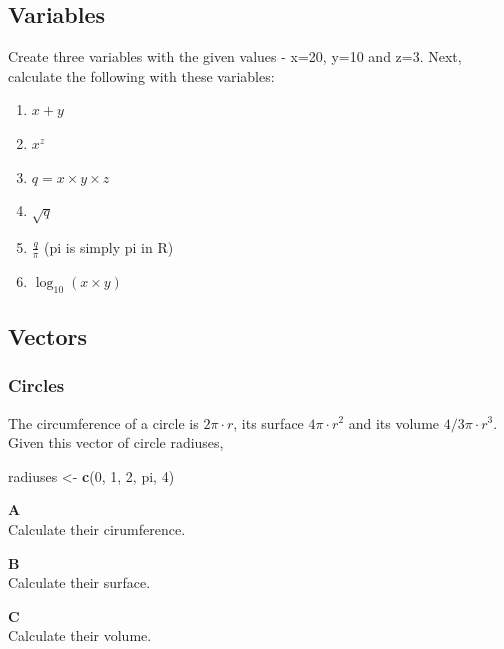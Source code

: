 \documentclass[]{book}
\newenvironment{Shaded}{\begin{snugshade}}{\end{snugshade}}
\newcommand{\DecValTok}[1]{\textcolor[rgb]{0.00,0.00,0.81}{#1}}
\newcommand{\KeywordTok}[1]{\textcolor[rgb]{0.13,0.29,0.53}{\textbf{#1}}}
\newcommand{\NormalTok}[1]{#1}
\newcommand{\StringTok}[1]{\textcolor[rgb]{0.31,0.60,0.02}{#1}}
\providecommand{\tightlist}{%
  \setlength{\itemsep}{0pt}\setlength{\parskip}{0pt}}
\begin{document}
\hypertarget{variables-1}{%
\subsection{Variables}\label{variables-1}}

Create three variables with the given values - x=20, y=10 and z=3. Next, calculate the following with these variables:

\begin{enumerate}
\def\labelenumi{\arabic{enumi}.}
\tightlist
\item
  \(x+y\)
\item
  \(x^z\)
\item
  \(q = x \times y \times z\)
\item
  \(\sqrt{q}\)
\item
  \(\frac{q}{\pi}\) (pi is simply pi in R)
\item
  \(\log_{10}{(x \times y)}\)
\end{enumerate}

\hypertarget{vectors-1}{%
\subsection{Vectors}\label{vectors-1}}

\hypertarget{circles}{%
\subsubsection*{Circles}\label{circles}}

The circumference of a circle is \(2\pi\cdot r\), its surface \(4\pi \cdot r^2\) and its volume \(4/3 \pi\cdot r^3\).
Given this vector of circle radiuses,

\begin{Shaded}
\begin{Highlighting}[]
\NormalTok{radiuses <-}\StringTok{ }\KeywordTok{c}\NormalTok{(}\DecValTok{0}\NormalTok{, }\DecValTok{1}\NormalTok{, }\DecValTok{2}\NormalTok{, pi, }\DecValTok{4}\NormalTok{)}
\end{Highlighting}
\end{Shaded}

\textbf{A}\\
Calculate their cirumference.

\textbf{B}\\
Calculate their surface.

\textbf{C}\\
Calculate their volume.
\end{document}
